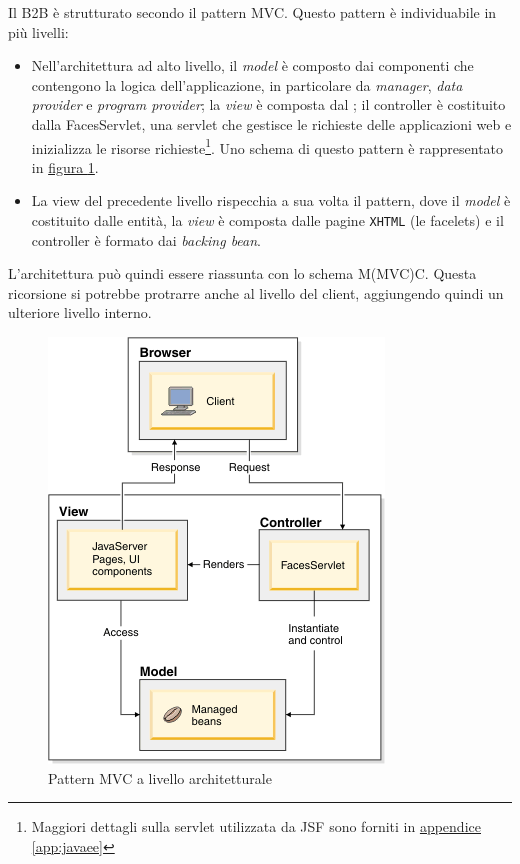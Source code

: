 Il B2B è strutturato secondo il pattern \Gls{MVC}. Questo pattern è individuabile in più livelli:
\begin{itemize}
	\hbadness = 1331
	\item Nell'architettura ad alto livello, il \textit{model} è composto dai componenti che contengono la logica dell'applicazione, in particolare da \textit{manager}, \textit{data provider} e \textit{program provider}; la \textit{view} è composta dal ; il controller è costituito dalla FacesServlet, una \gls{servlet} che gestisce le richieste delle applicazioni web e inizializza le risorse richieste\footnote{Maggiori dettagli sulla servlet utilizzata da JSF sono forniti in \hyperref[app:javaee]{appendice \ref{app:javaee}}}. Uno schema di questo pattern è rappresentato in \hyperref[fig:mvc-arch]{figura \ref{fig:mvc-arch}}\autocite{bib:jsf-mvc}.
	\item La view del precedente livello rispecchia a sua volta il pattern, dove il \textit{model} è costituito dalle entità, la \textit{view} è composta dalle pagine \texttt{\gls{XHTML}} (le \gls{facelets}) e il controller è formato dai \textit{backing bean}.
\end{itemize}
L'architettura può quindi essere riassunta con lo schema M(MVC)C. Questa ricorsione si potrebbe protrarre anche al livello del client, aggiungendo quindi un ulteriore livello interno.
\begin{figure}
	\centering
	\includegraphics{Immagini/mvc-jsf.png}
	\caption{Pattern MVC a livello architetturale}
	\label{fig:mvc-arch}
\end{figure}

